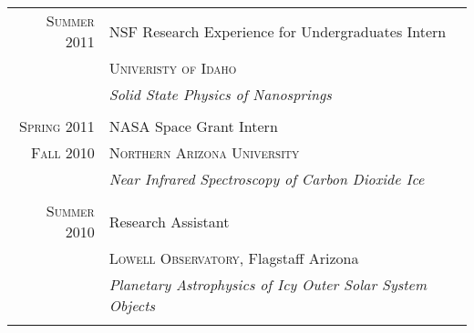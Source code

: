\documentclass[letterpaper,10pt]{article} %
\begin{document}
\begin{tabular}{r|p{11cm}}

\textsc{Summer 2011} & NSF Research Experience for Undergraduates Intern \\
& \textsc{Univeristy of Idaho} \\

&\emph{Solid State Physics of Nanosprings}\\ 

\multicolumn{2}{c}{} \\


\textsc{Spring 2011} & NASA Space Grant Intern\\
\textsc{Fall 2010} & \textsc{Northern Arizona University} \\
&\emph{Near Infrared Spectroscopy of Carbon Dioxide Ice}\\ 

\multicolumn{2}{c}{} \\


\textsc{Summer 2010} & Research Assistant \\
& \textsc{Lowell Observatory}, Flagstaff Arizona \\
&\emph{Planetary Astrophysics of Icy Outer Solar System Objects}\\ 

\multicolumn{2}{c}{} \\


\end{tabular}
\end{document}
